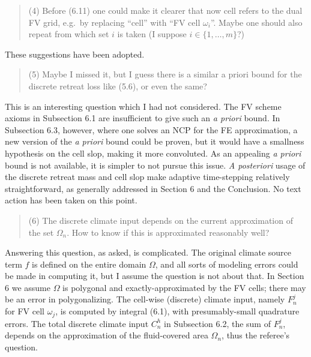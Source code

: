 \documentclass[12pt]{amsart}
\newcommand{\mm}{\medskip \noindent}
\begin{document}
\begin{quote}
\mm (4) Before (6.11) one could make it clearer that now cell refers to the dual FV grid, e.g.~by replacing ``cell'' with ``FV cell $\omega_i$''.  Maybe one should also repeat from which set $i$ is taken (I suppose $i \in \{1,\dots,m\}$?)
\end{quote}

These suggestions have been adopted.

\begin{quote}
\mm (5) Maybe I missed it, but I guess there is a similar a priori bound for the discrete retreat loss like (5.6), or even the same?
\end{quote}

This is an interesting question which I had not considered.  The FV scheme axioms in Subsection 6.1 are insufficient to give such an \emph{a priori} bound.  In Subsection 6.3, however, where one solves an NCP for the FE approximation, a new version of the \emph{a priori} bound could be proven, but it would have a smallness hypothesis on the cell slop, making it more convoluted.  As an appealing \emph{a priori} bound is not available, it is simpler to not pursue this issue.  \emph{A posteriori} usage of the discrete retreat mass and cell slop make adaptive time-stepping relatively straightforward, as generally addressed in Section 6 and the Conclusion.  No text action has been taken on this point.

\begin{quote}
\mm (6) The discrete climate input depends on the current approximation of the set $\Omega_n$.  How to know if this is approximated reasonably well?
\end{quote}

Answering this question, as asked, is complicated.  The original climate source term $f$ is defined on the entire domain $\Omega$, and all sorts of modeling errors could be made in computing it, but I assume the question is not about that.  In Section 6 we assume $\Omega$ is polygonal and exactly-approximated by the FV cells; there may be an error in polygonalizing.  The cell-wise (discrete) climate input, namely $F_n^j$ for FV cell $\omega_j$, is computed by integral (6.1), with presumably-small quadrature errors.  The total discrete climate input $C_n^h$ in Subsection 6.2, the sum of $F_n^j$, depends on the approximation of the fluid-covered area $\Omega_n$, thus the referee's question.
\end{document}
